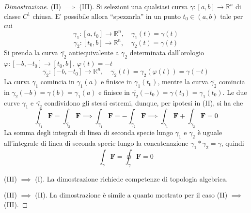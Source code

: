 \documentclass{article}
\begin{document}
\begin{proof}[Dimostrazione]
                \vspace{10pt}
                (II) $\implies$ (III). Si selezioni una qualsiasi curva $\gamma: [a, b] \rightarrow \mathbb{R}^{n}$ di classe $C^{1}$ chiusa. E' possibile allora ``spezzarla'' in un punto $t_{0} \in (a, b)$ tale per cui 
                \[
                    \gamma_{1}: [a, t_{0}] \rightarrow \mathbb{R}^{n}, \quad \gamma_{1}(t) = \gamma(t)
                \]
                \[
                    \gamma_{2}: [t_{0}, b] \rightarrow \mathbb{R}^{n}, \quad \gamma_{2}(t) = \gamma(t)
                \]
                Si prenda la curva $\overline{\gamma_{2}}$ antiequivalente a $\gamma_{2}$ determinata dall'orologio $\varphi: [-b, -t_{0}] \rightarrow [t_{0}, b]$, $\varphi(t) = -t$
                \[
                    \overline{\gamma_{2}}: [-b, -t_{0}] \rightarrow \mathbb{R}^{n}, \quad \overline{\gamma_{2}}(t) = \gamma_{2}(\varphi(t)) = \gamma(-t)
                \]
                La curva $\gamma_{1}$ comincia in $\gamma_{1}(a)$ e finisce in $\gamma_{1}(t_{0})$, mentre la curva $\overline{\gamma_{2}}$ comincia in $\gamma_{2}(-b) = \gamma(b) = \gamma_{1}(a)$ e finisce in $\overline{\gamma_{2}}(-t_{0}) = \gamma(t_{0}) = \gamma_{1}(t_{0})$.
                Le due curve $\gamma_{1}$ e $\overline{\gamma_{2}}$ condividono gli stessi estremi, dunque, per ipotesi in (II), si ha che
                \[
                    \int_{\gamma_{1}} \mathbf{F} = \int_{\overline{\gamma_{2}}} \mathbf{F} \implies \int_{\gamma_{1}} \mathbf{F} = - \int_{\gamma_{2}} \mathbf{F} \implies \int_{\gamma_{1}} \mathbf{F} + \int_{\gamma_{2}} \mathbf{F} = 0
                \]
                La somma degli integrali di linea di seconda specie lungo $\gamma_{1}$ e $\gamma_{2}$ è uguale all'integrale di linea di seconda specie lungo la concatenazione $\gamma_{1} * \gamma_{2} = \gamma$, quindi
                \[
                    \int_{\gamma} \mathbf{F} = \oint_{\gamma} \mathbf{F} = 0
                \]
                
                \vspace{10pt}
                (III) $\implies$ (I). La dimostrazione richiede competenze di topologia algebrica.

                \vspace{10pt}
                (III) $\implies$ (II). La dimostrazione è simile a quanto mostrato per il caso (II) $\implies$ (III).
            \end{proof}

            \vspace{10pt}
\end{document}

